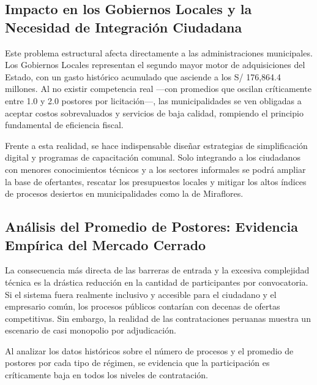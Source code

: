 \documentclass[12pt,a4paper]{article}
\begin{document}
\subsection{Impacto en los Gobiernos Locales y la Necesidad de Integración Ciudadana}
Este problema estructural afecta directamente a las administraciones municipales. Los Gobiernos Locales representan el segundo mayor motor de adquisiciones del Estado, con un gasto histórico acumulado que asciende a los S/ 176,864.4 millones. Al no existir competencia real ---con promedios que oscilan críticamente entre 1.0 y 2.0 postores por licitación---, las municipalidades se ven obligadas a aceptar costos sobrevaluados y servicios de baja calidad, rompiendo el principio fundamental de eficiencia fiscal.

Frente a esta realidad, se hace indispensable diseñar estrategias de simplificación digital y programas de capacitación comunal. Solo integrando a los ciudadanos con menores conocimientos técnicos y a los sectores informales se podrá ampliar la base de ofertantes, rescatar los presupuestos locales y mitigar los altos índices de procesos desiertos en municipalidades como la de Miraflores.

\subsection{Análisis del Promedio de Postores: Evidencia Empírica del Mercado Cerrado}
La consecuencia más directa de las barreras de entrada y la excesiva complejidad técnica es la drástica reducción en la cantidad de participantes por convocatoria. Si el sistema fuera realmente inclusivo y accesible para el ciudadano y el empresario común, los procesos públicos contarían con decenas de ofertas competitivas. Sin embargo, la realidad de las contrataciones peruanas muestra un escenario de casi monopolio por adjudicación.

Al analizar los datos históricos sobre el número de procesos y el promedio de postores por cada tipo de régimen, se evidencia que la participación es críticamente baja en todos los niveles de contratación.
\end{document}
